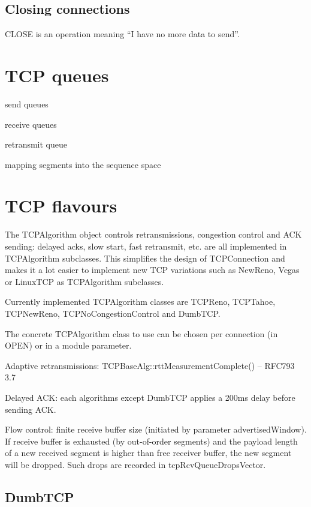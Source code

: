 \subsection{Closing connections}

CLOSE is an operation meaning ``I have no more data to send''.


\section{TCP queues}

send queues

receive queues

retransmit queue

mapping segments into the sequence space


\section{TCP flavours}
\label{sec:tcp_flavours}

The TCPAlgorithm object controls
retransmissions, congestion control and ACK sending: delayed acks, slow start,
fast retransmit, etc. are all implemented in TCPAlgorithm subclasses.
This simplifies the design of TCPConnection and makes it a lot easier to
implement new TCP variations such as NewReno, Vegas or LinuxTCP as
TCPAlgorithm subclasses.

Currently implemented TCPAlgorithm classes are TCPReno, TCPTahoe, TCPNewReno,
TCPNoCongestionControl and DumbTCP.


The concrete TCPAlgorithm class to use can be chosen per connection (in OPEN)
or in a module parameter.

Adaptive retransmissions: TCPBaseAlg::rttMeasurementComplete() -- RFC793 3.7

Delayed ACK: each algorithms except DumbTCP applies a 200ms delay
before sending ACK.

Flow control: finite receive buffer size (initiated by parameter
advertisedWindow). If receive buffer is exhausted (by out-of-order
segments) and the payload length of a new received segment
is higher than free receiver buffer, the new segment will be dropped.
Such drops are recorded in tcpRcvQueueDropsVector.

\subsection{DumbTCP}

